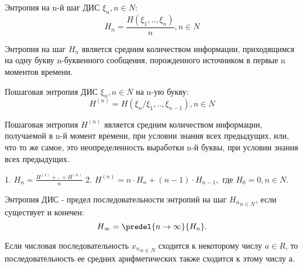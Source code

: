 \begin{defs}
Энтропия на n-й шаг ДИС ${\xi_n, n \in N}:$
$$H_n = \frac{H(\xi_1,..,\xi_n)}{n}, n \in N$$

Энтропия на шаг $H_n$ является средним количеством информации, приходящимся на
одну букву n-буквенного сообщения, порожденного источником в первые n моментов времени.
\end{defs}

\begin{defs}
Пошаговая энтропия ДИС ${\xi_n, n \in N}$ на n-ую букву:
$$H^{(n)} = {H(\xi_n /\xi_1,..,\xi_{n-1})}, n \in N$$

Пошаговая энтропия $H^{(n)}$ является средним количеством информации, получаемой в
n-й момент времени, при условии знания всех предыдущих, или, что то же самое, это неопределенность выработки n-й буквы, при условии знания всех предыдущих.
\end{defs}

\begin{proofs}
1. $H_n = \frac{H^{(1)}+..+ H^{(n)}}{n}$
2. $H^{(n)} = n\cdot H_n + (n-1)\cdot H_{n-1},$ где $H_0 = 0, n \in N.$
\end{proofs}

\begin{defs}
Энтропия ДИС - предел последовательности энтропий на шаг ${H_n}_{n \in N}$, если существует и конечен:
$$H_{\infty} = \predel{n \rightarrow \infty}{H_n}.$$
\end{defs}

\begin{proofs}[Лемма]
Если числовая последовательность ${x_n}_{n \in N}$ сходится к некоторому числу $a \in R$, то последовательность ее средних арифметических также сходится к этому числу $а$.
\end{proofs}

